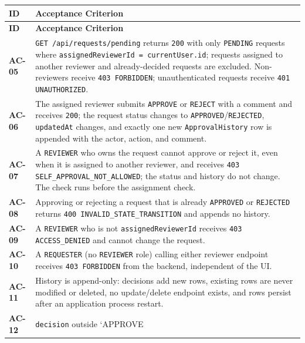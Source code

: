 \documentclass[11pt,a4paper]{article}
\begin{document}
\vspace{0.3em}
\begin{longtable}{|>{\RaggedRight}p{4.5cm}|>{\RaggedRight}p{11.3cm}|}
\hline
\rowcolor{zenPale}\textbf{ID} & \textbf{Acceptance Criterion} \\ \hline
\endfirsthead
\hline
\rowcolor{zenPale}\textbf{ID} & \textbf{Acceptance Criterion} \\ \hline
\endhead
\hline
\endfoot
\textbf{AC-05} & \texttt{GET /\allowbreak api/\allowbreak requests/\allowbreak pending} returns \texttt{200} with only \texttt{PENDING} requests where \texttt{assignedReviewerId = currentUser.\allowbreak id}; requests assigned to another reviewer and already-decided requests are excluded. Non-reviewers receive \texttt{403 FORBIDDEN}; unauthenticated requests receive \texttt{401 UNAUTHORIZED}. \\ \hline
\textbf{AC-06} & The assigned reviewer submits \texttt{APPROVE} or \texttt{REJECT} with a comment and receives \texttt{200}; the request status changes to \texttt{APPROVED}/\texttt{REJECTED}, \texttt{updatedAt} changes, and exactly one new \texttt{ApprovalHistory} row is appended with the actor, action, and comment. \\ \hline
\textbf{AC-07} & A \texttt{REVIEWER} who owns the request cannot approve or reject it, even when it is assigned to another reviewer, and receives \texttt{403 SELF\_\allowbreak APPROVAL\_\allowbreak NOT\_\allowbreak ALLOWED}; the status and history do not change. The check runs before the assignment check. \\ \hline
\textbf{AC-08} & Approving or rejecting a request that is already \texttt{APPROVED} or \texttt{REJECTED} returns \texttt{400 INVALID\_\allowbreak STATE\_\allowbreak TRANSITION} and appends no history. \\ \hline
\textbf{AC-09} & A \texttt{REVIEWER} who is not \texttt{assignedReviewerId} receives \texttt{403 ACCESS\_\allowbreak DENIED} and cannot change the request. \\ \hline
\textbf{AC-10} & A \texttt{REQUESTER} (no \texttt{REVIEWER} role) calling either reviewer endpoint receives \texttt{403 FORBIDDEN} from the backend, independent of the UI. \\ \hline
\textbf{AC-11} & History is append-only: decisions add new rows, existing rows are never modified or deleted, no update/delete endpoint exists, and rows persist after an application process restart. \\ \hline
\textbf{AC-12} & \texttt{decision} outside `APPROVE \ \\ \hline
\end{longtable}
\vspace{0.3em}
\end{document}
